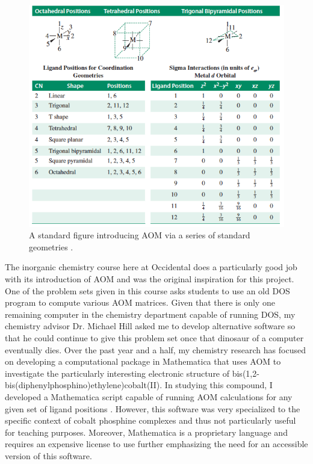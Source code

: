 \documentclass[10pt,twocolumn]{article}
\begin{document}
\begin{figure}
	\centering
	\includegraphics[width=.95\linewidth]{aomslide.png}
	\caption{
		A standard figure introducing AOM via a series of standard geometries \cite{miessler_inorganic_2014}.
	}
	\label{fig:aomslide}
\end{figure}

The inorganic chemistry course here at Occidental does a particularly good job with its introduction of AOM and was the original inspiration for this project. One of the problem sets given in this course asks students to use an old DOS program to compute various AOM matrices. Given that there is only one remaining computer in the chemistry department capable of running DOS, my chemistry advisor Dr. Michael Hill asked me to develop alternative software so that he could continue to give this problem set once that dinosaur of a computer eventually dies. Over the past year and a half, my chemistry research has focused on developing a computational package in Mathematica that uses AOM to investigate the particularly interesting electronic structure of bis(1,2-bis(diphenylphosphino)ethylene)cobalt(II). In studying this compound, I developed a Mathematica script capable of running AOM calculations for any given set of ligand positions \cite{thomascolwell2022}. However, this software was very specialized to the specific context of cobalt phosphine complexes and thus not particularly useful for teaching purposes. Moreover, Mathematica is a proprietary language and requires an expensive license to use further emphasizing the need for an accessible version of this software. 
\end{document}
